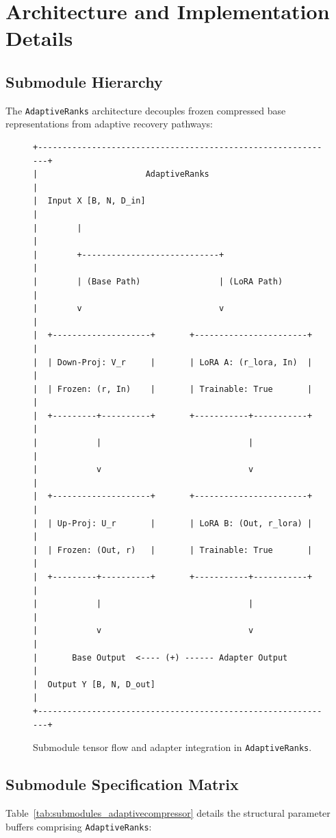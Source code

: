 \section{Architecture and Implementation Details}

\subsection{Submodule Hierarchy}
The \texttt{AdaptiveRanks} architecture decouples frozen compressed base representations from adaptive recovery pathways:

\begin{figure}[H]
\centering
\begin{verbatim}
+-------------------------------------------------------------+
|                      AdaptiveRanks                          |
|  Input X [B, N, D_in]                                       |
|        |                                                    |
|        +----------------------------+                       |
|        | (Base Path)                | (LoRA Path)           |
|        v                            v                       |
|  +--------------------+       +-----------------------+     |
|  | Down-Proj: V_r     |       | LoRA A: (r_lora, In)  |     |
|  | Frozen: (r, In)    |       | Trainable: True       |     |
|  +---------+----------+       +-----------+-----------+     |
|            |                              |                 |
|            v                              v                 |
|  +--------------------+       +-----------------------+     |
|  | Up-Proj: U_r       |       | LoRA B: (Out, r_lora) |     |
|  | Frozen: (Out, r)   |       | Trainable: True       |     |
|  +---------+----------+       +-----------+-----------+     |
|            |                              |                 |
|            v                              v                 |
|       Base Output  <---- (+) ------ Adapter Output          |
|  Output Y [B, N, D_out]                                     |
+-------------------------------------------------------------+
\end{verbatim}
\caption{Submodule tensor flow and adapter integration in \texttt{AdaptiveRanks}.}
\end{figure}

\subsection{Submodule Specification Matrix}
Table~\ref{tab:submodules_adaptivecompressor} details the structural parameter buffers comprising \texttt{AdaptiveRanks}:

